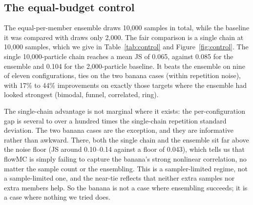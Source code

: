 \documentclass[11pt]{article}
\begin{document}
\subsection{The equal-budget control}
\label{sec:control}
The equal-per-member ensemble draws 10,000 samples in total, while the
baseline it was compared with draws only 2,000. The fair comparison is a
single chain at 10,000 samples, which we give in Table~\ref{tab:control} and
Figure~\ref{fig:control}. The single 10,000-particle chain reaches a mean JS
of 0.065, against 0.085 for the ensemble and 0.104 for the 2,000-particle
baseline. It beats the ensemble on nine of eleven configurations, ties on the
two banana cases (within repetition noise), with 17\% to 44\% improvements on exactly
those targets where the ensemble had looked strongest (bimodal, funnel,
correlated, ring).

The single-chain advantage is not marginal where it exists: the
per-configuration gap is several to over a hundred times the single-chain
repetition standard deviation. The two banana cases are the exception, and
they are informative rather than awkward. There, both the single chain and the
ensemble sit far above the noise floor (JS around 0.10--0.14 against a floor of
0.043), which tells us that flowMC is simply failing to capture the banana's
strong nonlinear correlation, no matter the sample count or the ensembling.
This is a sampler-limited regime, not a sample-limited one, and the near-tie
reflects that neither extra samples nor extra members help. So the banana is
not a case where ensembling succeeds; it is a case where nothing we tried does.
\end{document}
